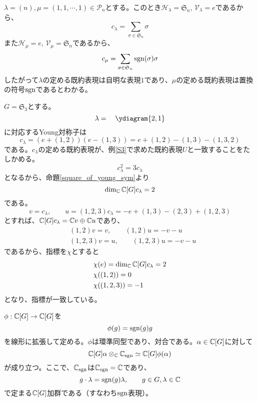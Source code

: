 \documentclass{ltjsreport}
\begin{document}
\begin{eg}
  $\lambda=(n),\mu=(1,1,\cdots,1)\in\mathcal{P}_n$とする。このとき$\mathcal{H}_\lambda=\mathfrak{S}_n$, $\mathcal{V}_\lambda=e$であるから、
  \[
  c_\lambda=\sum_{\sigma\in\mathfrak{S}_n}\sigma  
  \]
  また$\mathcal{H}_\mu=e$, $\mathcal{V}_\mu=\mathfrak{S}_n$であるから、
  \[
  c_\mu=\sum_{\sigma\in\mathfrak{S}_n}\mathrm{sgn}(\sigma)\sigma  
  \]
  したがって$\lambda$の定める既約表現は自明な表現$1$であり、$\mu$の定める既約表現は置換の符号$\mathrm{sgn}$であるとわかる。
\end{eg}



\begin{eg}
  $G=\mathfrak{S}_3$とする。
  \[
  \lambda=\quad\ydiagram{2,1}  
  \]
  に対応するYoung対称子は
  \[
  c_\lambda=(e+(1,2))(e-(1,3))=e+(1,2)-(1,3)-(1,3,2)
  \]
  である。$c_\lambda$の定める既約表現が、例\ref{S3}で求めた既約表現$U$と一致することをたしかめる。
  \[
  c_\lambda^2=3c_\lambda  
  \]
  となるから、命題\ref{square_of_young_sym}より
  \[
  \dim_{\mathbb{C}}\mathbb{C}[G]c_\lambda=2  
  \]
  である。
  \[
  v=c_\lambda, \qquad u=(1,2,3)c_\lambda=-e+(1,3)-(2,3)+(1,2,3)
  \]
  とすれば、$\mathbb{C}[G]c_\lambda=\mathbb{C} v\oplus\mathbb{C} u$であり、
  \begin{align*}
    &(1,2)v=v,\qquad (1,2)u=-v-u\\
    &(1,2,3)v=u,\qquad (1,2,3)u=-v-u
  \end{align*}
  であるから、指標を$\chi$とすると
  \begin{align*}
  &\chi(e)=\dim_{\mathbb{C}}\mathbb{C}[G]c_\lambda=2  \\
  &\chi((1,2))=0\\
  &\chi((1,2,3))=-1 
  \end{align*}
  となり、指標が一致している。
\end{eg}




\begin{lemm}\label{tensor_with_sgn_rep}
  $\phi:\mathbb{C}[G]\rightarrow\mathbb{C}[G]$を
  \[
  \phi(g)=\mathrm{sgn}(g)g  
  \]
  を線形に拡張して定める。$\phi$は環準同型であり、対合である。$\alpha\in\mathbb{C}[G]$に対して
  \[
  \mathbb{C}[G]\alpha\otimes_{\mathbb{C}} \mathbb{C}_{\mathrm{sgn}}\simeq \mathbb{C}[G]\phi(\alpha)
  \]
  が成り立つ。ここで、$\mathbb{C}_{\mathrm{sgn}}$は$\mathbb{C}_{\mathrm{sgn}}=\mathbb{C}$であり、
  \[
  g\cdot\lambda=\mathrm{sgn}(g)\lambda,\qquad g\in G,\lambda\in\mathbb{C}
  \]
  で定まる$\mathbb{C}[G]$加群である（すなわち$\mathrm{sgn}$表現）。
\end{lemm}
\end{document}
